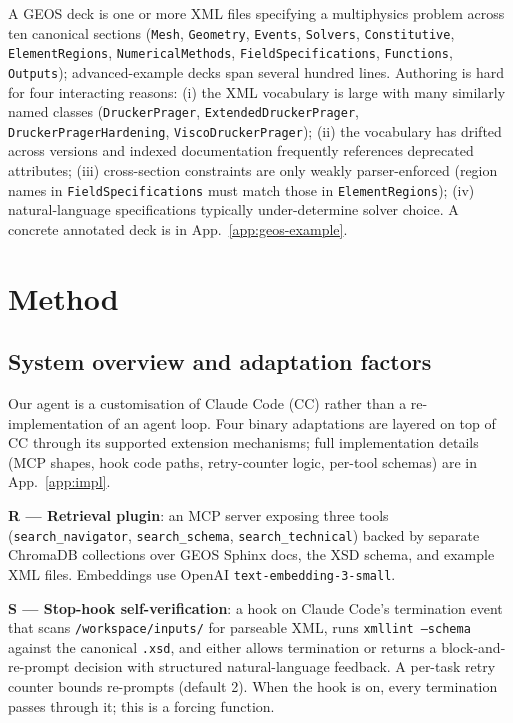 \documentclass{article}
\begin{document}
A GEOS deck is one or more XML files specifying a multiphysics problem across ten canonical sections (\texttt{Mesh}, \texttt{Geometry}, \texttt{Events}, \texttt{Solvers}, \texttt{Constitutive}, \texttt{ElementRegions}, \texttt{NumericalMethods}, \texttt{FieldSpecifications}, \texttt{Functions}, \texttt{Outputs}); advanced-example decks span several hundred lines. Authoring is hard for four interacting reasons: (i) the XML vocabulary is large with many similarly named classes (\texttt{DruckerPrager}, \texttt{ExtendedDruckerPrager}, \texttt{DruckerPragerHardening}, \texttt{ViscoDruckerPrager}); (ii) the vocabulary has drifted across versions and indexed documentation frequently references deprecated attributes; (iii) cross-section constraints are only weakly parser-enforced (region names in \texttt{FieldSpecifications} must match those in \texttt{ElementRegions}); (iv) natural-language specifications typically under-determine solver choice. A concrete annotated deck is in App.~\ref{app:geos-example}.


\section{Method}
\label{sec:method}

\subsection{System overview and adaptation factors}
\label{subsec:overview}

Our agent is a customisation of Claude Code (CC) rather than a re-implementation of an agent loop. Four binary adaptations are layered on top of CC through its supported extension mechanisms; full implementation details (MCP shapes, hook code paths, retry-counter logic, per-tool schemas) are in App.~\ref{app:impl}.

\textbf{R --- Retrieval plugin}: an MCP server exposing three tools (\texttt{search\_navigator}, \texttt{search\_schema}, \texttt{search\_technical}) backed by separate ChromaDB collections over GEOS Sphinx docs, the XSD schema, and example XML files. Embeddings use OpenAI \texttt{text-embedding-3-small}.

\textbf{S --- Stop-hook self-verification}: a hook on Claude Code's termination event that scans \texttt{/workspace/inputs/} for parseable XML, runs \texttt{xmllint --schema} against the canonical \texttt{.xsd}, and either allows termination or returns a block-and-re-prompt decision with structured natural-language feedback. A per-task retry counter bounds re-prompts (default 2). When the hook is on, every termination passes through it; this is a forcing function.
\end{document}
